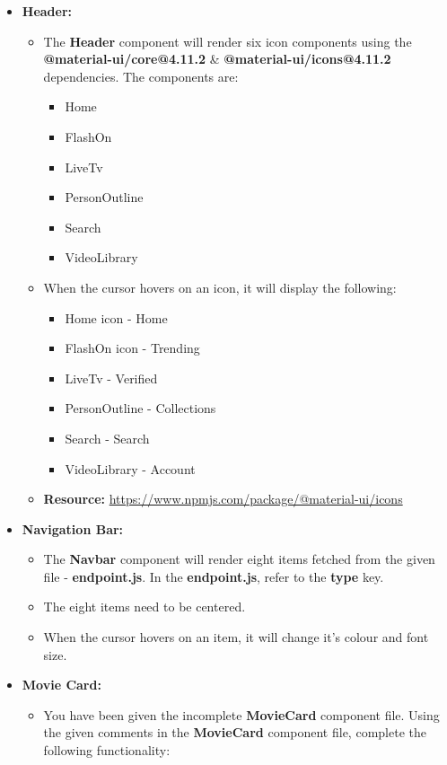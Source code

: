 \documentclass{article}
\begin{document}
\begin{itemize}
	\item \textbf{Header:}
	\begin{itemize}
		\item The \textbf{Header} component will render six icon components using the \textbf{@material-ui/core@4.11.2} \& \textbf{@material-ui/icons@4.11.2} dependencies. The components are:
		\begin{itemize}
			\item Home
			\item FlashOn
			\item LiveTv
			\item PersonOutline
			\item Search
			\item VideoLibrary
		\end{itemize} 
		\item When the cursor hovers on an icon, it will display the following:
		\begin{itemize}
			\item Home icon - Home
			\item FlashOn icon - Trending
			\item LiveTv - Verified
			\item PersonOutline - Collections
			\item Search - Search
			\item VideoLibrary - Account
		\end{itemize}
		\item \textbf{Resource:} \href{https://www.npmjs.com/package/@material-ui/icons}{https://www.npmjs.com/package/@material-ui/icons}
	\end{itemize}
	\item \textbf{Navigation Bar:}
	\begin{itemize}
		\item The \textbf{Navbar} component will render eight items fetched from the given file - \textbf{endpoint.js}. In the \textbf{endpoint.js}, refer to the \textbf{type} key.
		\item The eight items need to be centered.
		\item When the cursor hovers on an item, it will change it's colour and font size.
	\end{itemize}
	\item \textbf{Movie Card:}
	\begin{itemize}
		\item You have been given the incomplete \textbf{MovieCard} component file. Using the given comments in the \textbf{MovieCard} component file, complete the following functionality:

\end{itemize}
\end{itemize}
\end{document}
